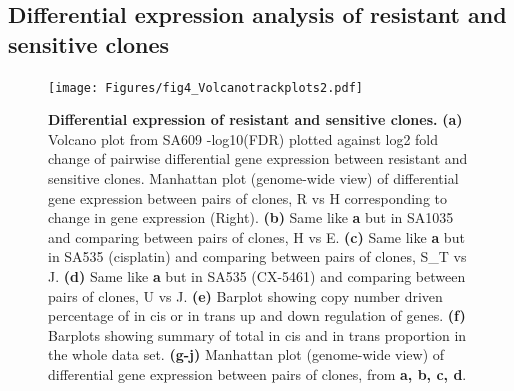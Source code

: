 \subsection{Differential expression  analysis of resistant and sensitive clones}




\begin{figure}
\centering
  \texttt{[image: Figures/fig4\_Volcanotrackplots2.pdf]}
\caption[DE of resistant and sensitive clonealign defined clones]
	{\small
	\textbf{Differential expression of resistant and sensitive clones.}
	\textbf{(a)} Volcano plot from SA609 -log10(FDR) plotted against log2 fold change of pairwise differential gene expression between resistant and sensitive clones. Manhattan plot (genome-wide view) of differential gene expression between pairs of clones, R vs H corresponding to change in gene expression (Right).
	    \textbf{(b)} Same like \textbf{a} but in SA1035 and comparing between pairs of clones, H vs E. 
	     \textbf{(c)} Same like \textbf{a} but in SA535 (cisplatin) and comparing between pairs of clones, S\_T vs J. 
	     \textbf{(d)} Same like \textbf{a} but in SA535 (CX-5461) and comparing between pairs of clones, U vs J.
	   \textbf{(e)} Barplot showing copy number driven percentage of in cis or in trans up and down regulation of genes.
	   \textbf{(f)} Barplots showing summary of total in cis and in trans proportion in the whole data set.
	     \textbf{(g-j)} Manhattan plot (genome-wide view) of differential gene expression between pairs of clones, from \textbf{a, b, c, d}. }
	\label{fig:fig4_Volcanotrackplots2}
\end{figure}




